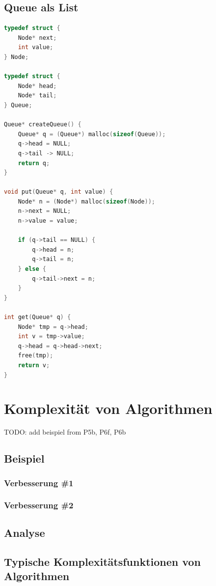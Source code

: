 \documentclass{article}
\begin{document}
\subsection{Queue als List}

\begin{lstlisting}[language=c, tabsize=4]
typedef struct {
    Node* next;
    int value;
} Node;

typedef struct {
    Node* head;
    Node* tail;
} Queue;

Queue* createQueue() {
    Queue* q = (Queue*) malloc(sizeof(Queue));
    q->head = NULL;
    q->tail -> NULL;
    return q;
}

void put(Queue* q, int value) {
    Node* n = (Node*) malloc(sizeof(Node));
    n->next = NULL;
    n->value = value;
    
    if (q->tail == NULL) {
        q->head = n;
        q->tail = n;
    } else {
        q->tail->next = n;
    }
}

int get(Queue* q) {
    Node* tmp = q->head;
    int v = tmp->value;
    q->head = q->head->next;
    free(tmp);
    return v;
}
\end{lstlisting}
\newpage

\section{Komplexität von Algorithmen}

TODO: add beispiel from P5b, P6f, P6b
\subsection{Beispiel}
\subsubsection{Verbesserung \#1}
\subsubsection{Verbesserung \#2}
\subsection{Analyse}
\subsection{Typische Komplexitätsfunktionen von Algorithmen}
\end{document}
